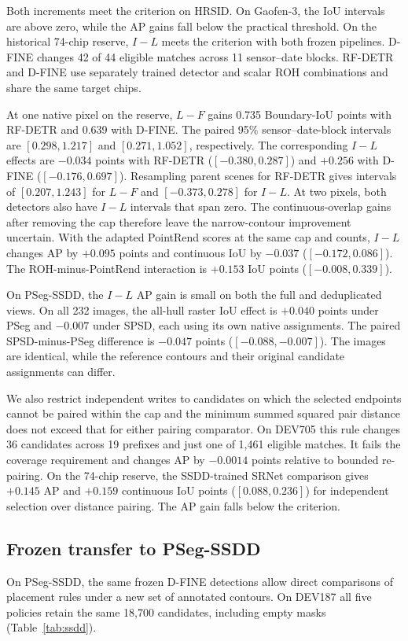 \documentclass[journal]{IEEEtran}
\begin{document}
Both increments meet the criterion on HRSID. On Gaofen-3, the IoU intervals are above zero, while the AP gains fall below the practical threshold. On the historical 74-chip reserve, \(I-L\) meets the criterion with both frozen pipelines. D-FINE changes 42 of 44 eligible matches across 11 sensor--date blocks. RF-DETR and D-FINE use separately trained detector and scalar ROH combinations and share the same target chips.

At one native pixel on the reserve, \(L-F\) gains 0.735 Boundary-IoU points with RF-DETR and 0.639 with D-FINE. The paired 95\% sensor--date-block intervals are \([0.298,1.217]\) and \([0.271,1.052]\), respectively. The corresponding \(I-L\) effects are \(-0.034\) points with RF-DETR (\([-0.380,0.287]\)) and \(+0.256\) with D-FINE (\([-0.176,0.697]\)). Resampling parent scenes for RF-DETR gives intervals of \([0.207,1.243]\) for \(L-F\) and \([-0.373,0.278]\) for \(I-L\). At two pixels, both detectors also have \(I-L\) intervals that span zero. The continuous-overlap gains after removing the cap therefore leave the narrow-contour improvement uncertain. With the adapted PointRend scores at the same cap and counts, \(I-L\) changes AP by \(+0.095\) points and continuous IoU by \(-0.037\) (\([-0.172,0.086]\)). The ROH-minus-PointRend interaction is \(+0.153\) IoU points (\([-0.008,0.339]\)).

On PSeg-SSDD, the \(I-L\) AP gain is small on both the full and deduplicated views. On all 232 images, the all-hull raster IoU effect is \(+0.040\) points under PSeg and \(-0.007\) under SPSD, each using its own native assignments. The paired SPSD-minus-PSeg difference is \(-0.047\) points (\([-0.088,-0.007]\)). The images are identical, while the reference contours and their original candidate assignments can differ.

We also restrict independent writes to candidates on which the selected endpoints cannot be paired within the cap and the minimum summed squared pair distance does not exceed that for either pairing comparator. On DEV705 this rule changes 36 candidates across 19 prefixes and just one of 1,461 eligible matches. It fails the coverage requirement and changes AP by \(-0.0014\) points relative to bounded re-pairing. On the 74-chip reserve, the SSDD-trained SRNet comparison gives \(+0.145\) AP and \(+0.159\) continuous IoU points (\([0.088,0.236]\)) for independent selection over distance pairing. The AP gain falls below the criterion.

\subsection{Frozen transfer to PSeg-SSDD}
On PSeg-SSDD, the same frozen D-FINE detections allow direct comparisons of placement rules under a new set of annotated contours. On DEV187 all five policies retain the same 18,700 candidates, including empty masks (Table~\ref{tab:ssdd}).
\end{document}
